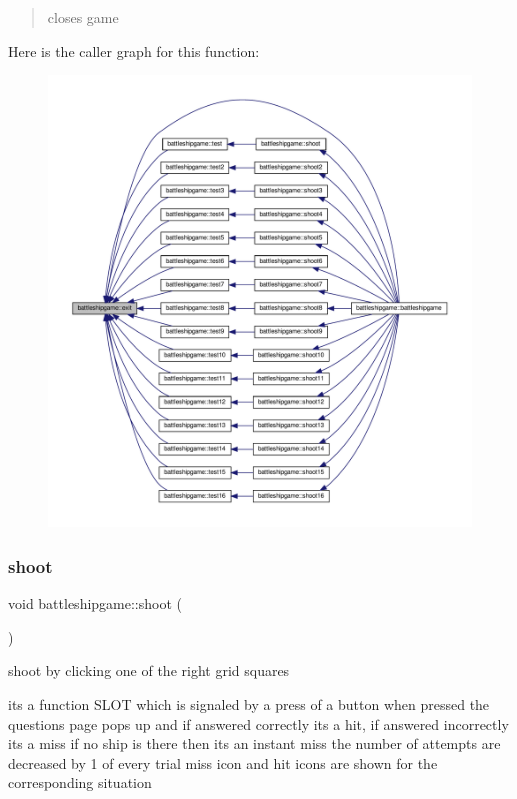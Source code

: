 \begin{quote}
closes game \end{quote}
Here is the caller graph for this function\+:
\nopagebreak
\begin{figure}[H]
\begin{center}
\leavevmode
\includegraphics[width=350pt]{classbattleshipgame_a498809fd1ed17350a8d7a459bbf734ae_icgraph}
\end{center}
\end{figure}
\mbox{\label{classbattleshipgame_aa5a079217b1de092692515bc8fda0443}} 
\subsubsection{\texorpdfstring{shoot}{shoot}}
{\footnotesize\ttfamily void battleshipgame\+::shoot (\begin{DoxyParamCaption}{ }\end{DoxyParamCaption})\hspace{0.3cm}{\ttfamily [slot]}}



shoot by clicking one of the right grid squares 

its a function S\+L\+OT which is signaled by a press of a button when pressed the questions page pops up and if answered correctly its a hit, if answered incorrectly its a miss if no ship is there then its an instant miss the number of attempts are decreased by 1 of every trial miss icon and hit icons are shown for the corresponding situation

